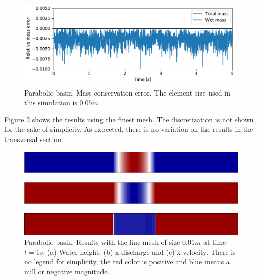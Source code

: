 \begin{figure}[H]
    \centering
    \includegraphics[width=.95\textwidth]{img/eulerian/par/mass_conservation}
    \caption{Parabolic basin. Mass conservation error. The element size used in this simulation is $0.05m$.}
    \label{parabola_mass}
\end{figure}

Figure \ref{parabola_results} shows the results using the finest mesh. The discretization is not shown for the sake of simplicity. As expected, there is no variation on the results in the transversal section.

\begin{figure}[H]
    \begin{subfigure}{.05\textwidth}
        \caption{}
    \end{subfigure}
    \begin{minipage}[c]{.94\textwidth}
        \includegraphics[width=\textwidth]{img/eulerian/par/height_1.0.png}
    \end{minipage}
\par\medskip
    \begin{subfigure}{.05\textwidth}
        \caption{}
    \end{subfigure}
    \begin{minipage}[c]{.94\textwidth}
        \includegraphics[width=\textwidth]{img/eulerian/par/momentum_1.0.png}
    \end{minipage}
\par\medskip
    \begin{subfigure}{.05\textwidth}
        \caption{}
    \end{subfigure}
    \begin{minipage}[c]{.94\textwidth}
        \includegraphics[width=\textwidth]{img/eulerian/par/velocity_1.0.png}
    \end{minipage}
\caption{Parabolic basin. Results with the fine mesh of size $0.01m$ at time $t=1s$. (a) Water height, (b) x-discharge and (c) x-velocity. There is no legend for simplicity, the red color is positive and blue means a null or negative magnitude.}
\label{parabola_results}
\end{figure}



